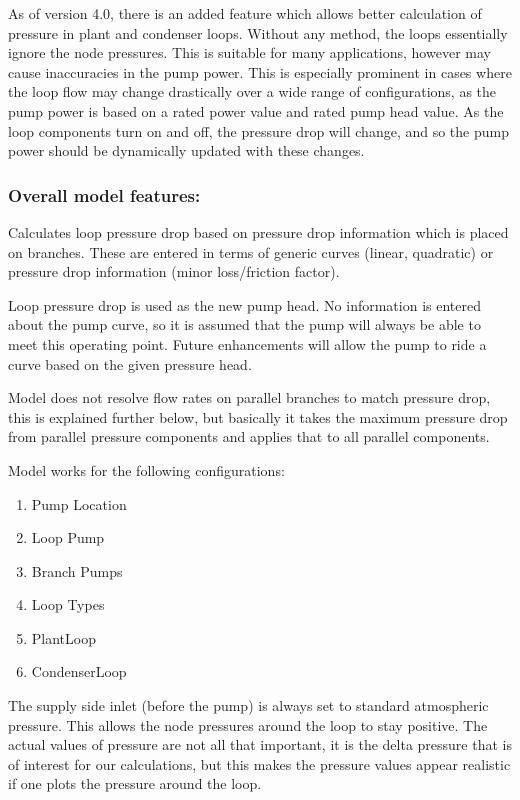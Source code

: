 As of version 4.0, there is an added feature which allows better calculation of pressure in plant and condenser loops. Without any method, the loops essentially ignore the node pressures. This is suitable for many applications, however may cause inaccuracies in the pump power. This is especially prominent in cases where the loop flow may change drastically over a wide range of configurations, as the pump power is based on a rated power value and rated pump head value. As the loop components turn on and off, the pressure drop will change, and so the pump power should be dynamically updated with these changes.

\subsubsection{Overall model features:}\label{overall-model-features}

Calculates loop pressure drop based on pressure drop information which is placed on branches. These are entered in terms of generic curves (linear, quadratic) or pressure drop information (minor loss/friction factor).

Loop pressure drop is used as the new pump head. No information is entered about the pump curve, so it is assumed that the pump will always be able to meet this operating point. Future enhancements will allow the pump to ride a curve based on the given pressure head.

Model does not resolve flow rates on parallel branches to match pressure drop, this is explained further below, but basically it takes the maximum pressure drop from parallel pressure components and applies that to all parallel components.

Model works for the following configurations:

\begin{enumerate}
\def\labelenumi{\arabic{enumi}.}
\item
  Pump Location
\item
  Loop Pump
\item
  Branch Pumps
\item
  Loop Types
\item
  PlantLoop
\item
  CondenserLoop
\end{enumerate}

The supply side inlet (before the pump) is always set to standard atmospheric pressure. This allows the node pressures around the loop to stay positive. The actual values of pressure are not all that important, it is the delta pressure that is of interest for our calculations, but this makes the pressure values appear realistic if one plots the pressure around the loop.

